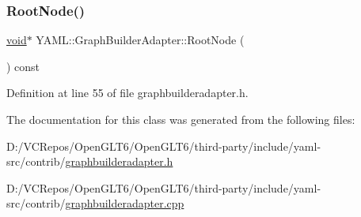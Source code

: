 \mbox{\label{class_y_a_m_l_1_1_graph_builder_adapter_a69626cdd468a5b907e13cb405ed08565}} 
\subsubsection{\texorpdfstring{RootNode()}{RootNode()}}
{\footnotesize\ttfamily \mbox{\hyperlink{glad_8h_a950fc91edb4504f62f1c577bf4727c29}{void}}$\ast$ Y\+A\+M\+L\+::\+Graph\+Builder\+Adapter\+::\+Root\+Node (\begin{DoxyParamCaption}{ }\end{DoxyParamCaption}) const\hspace{0.3cm}{\ttfamily [inline]}}



Definition at line 55 of file graphbuilderadapter.\+h.



The documentation for this class was generated from the following files\+:\begin{DoxyCompactItemize}
\item 
D\+:/\+V\+C\+Repos/\+Open\+G\+L\+T6/\+Open\+G\+L\+T6/third-\/party/include/yaml-\/src/contrib/\mbox{\hyperlink{graphbuilderadapter_8h}{graphbuilderadapter.\+h}}\item 
D\+:/\+V\+C\+Repos/\+Open\+G\+L\+T6/\+Open\+G\+L\+T6/third-\/party/include/yaml-\/src/contrib/\mbox{\hyperlink{graphbuilderadapter_8cpp}{graphbuilderadapter.\+cpp}}\end{DoxyCompactItemize}
